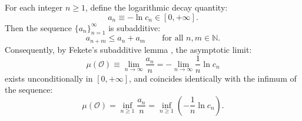 \begin{proposition}
\label{prop:fekete_existence}
For each integer $n \ge 1$, define the logarithmic decay quantity:
\begin{equation}
\label{eq:an_subadditive_def}
a_n \equiv -\ln c_n \in [0, +\infty].
\end{equation}
Then the sequence $\{a_n\}_{n=1}^\infty$ is subadditive:
\begin{equation}
\label{eq:subadditive_condition}
a_{n+m} \le a_n + a_m \qquad \text{for all } n, m \in \mathbb{N}.
\end{equation}
Consequently, by Fekete's subadditive lemma \cite{Fekete1923}, the asymptotic limit:
\begin{equation}
\label{eq:fekete_limit_exists}
\mu(\mathcal{O}) \equiv \lim_{n \to \infty} \frac{a_n}{n} = -\lim_{n \to \infty} \frac{1}{n} \ln c_n
\end{equation}
exists unconditionally in $[0, +\infty]$, and coincides identically with the infimum of the sequence:
\begin{equation}
\label{eq:fekete_infimum_identity}
\mu(\mathcal{O}) = \inf_{n \ge 1} \frac{a_n}{n} = \inf_{n \ge 1} \left( -\frac{1}{n} \ln c_n \right).
\end{equation}
\end{proposition}

